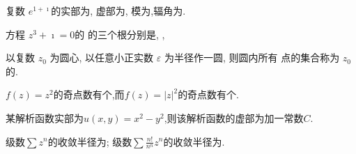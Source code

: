 \documentclass{njustexam}
\begin{document}
\renewcommand{\course}{数学物理方法}                          %
\renewcommand{\duration}{120}                                            %
\renewcommand{\credit}{5}                                                   %
\renewcommand{\syllabus}{11044102}                               %
\renewcommand{\fullmark}{100}                                            %
\renewcommand{\composer}{罗凯}            %
\renewcommand{\composedate}{2023年12月01日}                   %
\renewcommand{\validator}{}                                        %
\renewcommand{\coursetype}{1}                                            %
\renewcommand{\exammethod}{1}                                         %
\renewcommand{\testpaper}{A}                                              %

\makehead %


\begin{problem}
 复数 $e^{1+\imath}$的实部为, 虚部为, 
 模为,辐角为.
\end{problem}


\begin{problem}
方程 $z^3 + \imath = 0$的
的三个根分别是\fillout{$\imath$},
,
\end{problem}


\begin{problem}
  以复数 $z_0$ 为圆心, 以任意小正实数 $\varepsilon$ 为半径作一圆, 则圆内所有 点的集合称为 $z_0$ 的.
\end{problem}


\begin{problem}
$f(z)=z^2$的奇点数有个,而$f(z)=|z|^2$的奇点数有个.
\end{problem}


\begin{problem}
某解析函数实部为$u(x,y) = x^2 - y^2$,则该解析函数的虚部为加一常数$C$.
\end{problem}

\begin{problem}
  级数$\sum z^n$的收敛半径为;
  级数$\sum \frac{n !}{n^n} z^n$的收敛半径为.
 \end{problem}
\end{document}
